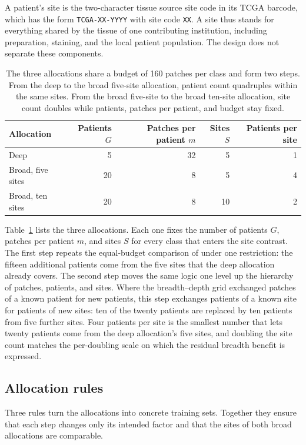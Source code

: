 \documentclass[11pt]{article}
\begin{document}
A patient's site is the two-character tissue source site code in its TCGA barcode, which has the form \texttt{TCGA-XX-YYYY} with site code \texttt{XX}. A site thus stands for everything shared by the tissue of one contributing institution, including preparation, staining, and the local patient population. The design does not separate these components.

\begin{table}[htbp]
\centering
\renewcommand{\arraystretch}{1.15}
\begin{tabular}{@{}lrrrr@{}}
\toprule
Allocation & Patients $G$ & Patches per patient $m$ & Sites $S$ & Patients per site \\
\midrule
Deep & 5 & 32 & 5 & 1 \\
Broad, five sites & 20 & 8 & 5 & 4 \\
Broad, ten sites & 20 & 8 & 10 & 2 \\
\bottomrule
\end{tabular}
\caption{The three allocations share a budget of 160 patches per class and form two steps. From the deep to the broad five-site allocation, patient count quadruples within the same sites. From the broad five-site to the broad ten-site allocation, site count doubles while patients, patches per patient, and budget stay fixed.}
\label{tab:allocations}
\end{table}

\noindent Table~\ref{tab:allocations} lists the three allocations. Each one fixes the number of patients $G$, patches per patient $m$, and sites $S$ for every class that enters the site contrast. The first step repeats the equal-budget comparison of \citet{queisler2026effectiveSupport} under one restriction: the fifteen additional patients come from the five sites that the deep allocation already covers. The second step moves the same logic one level up the hierarchy of patches, patients, and sites. Where the breadth--depth grid exchanged patches of a known patient for new patients, this step exchanges patients of a known site for patients of new sites: ten of the twenty patients are replaced by ten patients from five further sites. Four patients per site is the smallest number that lets twenty patients come from the deep allocation's five sites, and doubling the site count matches the per-doubling scale on which the residual breadth benefit is expressed.

\subsection{Allocation rules}
\label{sec:allocation}
Three rules turn the allocations into concrete training sets. Together they ensure that each step changes only its intended factor and that the sites of both broad allocations are comparable.
\end{document}
